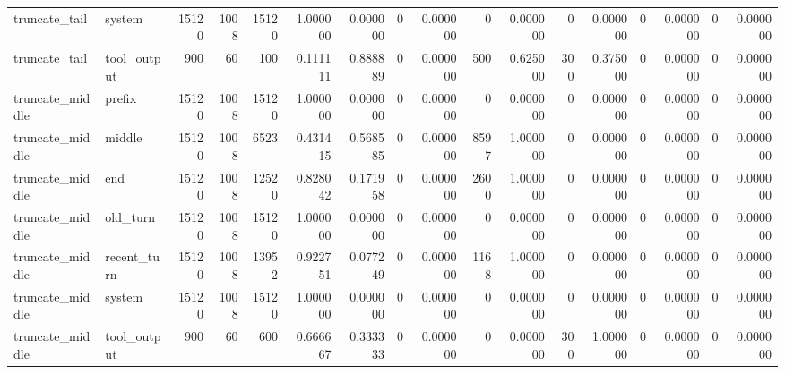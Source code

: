 \begin{tabular}{llrrrrrrrrrrrrrrr}
truncate_tail & system & 15120 & 1008 & 15120 & 1.000000 & 0.000000 & 0 & 0.000000 & 0 & 0.000000 & 0 & 0.000000 & 0 & 0.000000 & 0 & 0.000000 \\
truncate_tail & tool_output & 900 & 60 & 100 & 0.111111 & 0.888889 & 0 & 0.000000 & 500 & 0.625000 & 300 & 0.375000 & 0 & 0.000000 & 0 & 0.000000 \\
truncate_middle & prefix & 15120 & 1008 & 15120 & 1.000000 & 0.000000 & 0 & 0.000000 & 0 & 0.000000 & 0 & 0.000000 & 0 & 0.000000 & 0 & 0.000000 \\
truncate_middle & middle & 15120 & 1008 & 6523 & 0.431415 & 0.568585 & 0 & 0.000000 & 8597 & 1.000000 & 0 & 0.000000 & 0 & 0.000000 & 0 & 0.000000 \\
truncate_middle & end & 15120 & 1008 & 12520 & 0.828042 & 0.171958 & 0 & 0.000000 & 2600 & 1.000000 & 0 & 0.000000 & 0 & 0.000000 & 0 & 0.000000 \\
truncate_middle & old_turn & 15120 & 1008 & 15120 & 1.000000 & 0.000000 & 0 & 0.000000 & 0 & 0.000000 & 0 & 0.000000 & 0 & 0.000000 & 0 & 0.000000 \\
truncate_middle & recent_turn & 15120 & 1008 & 13952 & 0.922751 & 0.077249 & 0 & 0.000000 & 1168 & 1.000000 & 0 & 0.000000 & 0 & 0.000000 & 0 & 0.000000 \\
truncate_middle & system & 15120 & 1008 & 15120 & 1.000000 & 0.000000 & 0 & 0.000000 & 0 & 0.000000 & 0 & 0.000000 & 0 & 0.000000 & 0 & 0.000000 \\
truncate_middle & tool_output & 900 & 60 & 600 & 0.666667 & 0.333333 & 0 & 0.000000 & 0 & 0.000000 & 300 & 1.000000 & 0 & 0.000000 & 0 & 0.000000 \\
\bottomrule
\end{tabular}
